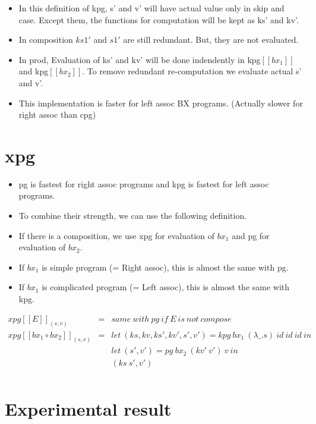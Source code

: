 \documentclass[runningheads]{llncs}
\begin{document}
\begin{itemize}
\item In this definition of kpg, s' and v' will have actual value only in skip and case. Except them, the functions for computation will be kept as ks' and kv'.
\item In composition $ks1'$ and $s1'$ are still redundant. But, they are not evaluated.
\item In prod, Evaluation of ks' and kv' will be done indendently in kpg$[\![bx_1]\!]$ and kpg$[\![bx_2]\!]$. To remove redundant re-computation we evaluate actual s' and v'.
\item This implementation is faster for left assoc BX programs. (Actually slower for right assoc than cpg)
\end{itemize}

\section{xpg}

\begin{itemize}
\item pg is fastest for right assoc programs and kpg is fastest for left assoc programs.
\item To combine their strength, we can use the following definition.
\item If there is a composition, we use xpg for evaluation of $bx_1$ and pg for evaluation of $bx_2$.
\item If $bx_1$ is simple program (= Right assoc), this is almost the same with pg.
\item If $bx_1$ is complicated program (= Left assoc), this is almost the same with kpg.
\end{itemize}

$
\begin{array}{lll}
  xpg [\![E]\!]_{(s, v)} & = & same \ with \ pg \ if \ E \ is \ not \ compose\\
  xpg [\![bx_1 \circ bx_2]\!]_{(s, v)} & = &
  let \ (ks, kv, ks', kv', s', v') = kpg \ bx_1 \ (\lambda \_. s) \ id \ id \ id \ in\\
  & & let \ (s', v') = pg \ bx_2 \ (kv' \ v') \ v \ in\\
  & & (ks \ s', v')\\
\end{array}
$

\section{Experimental result}
\end{document}
